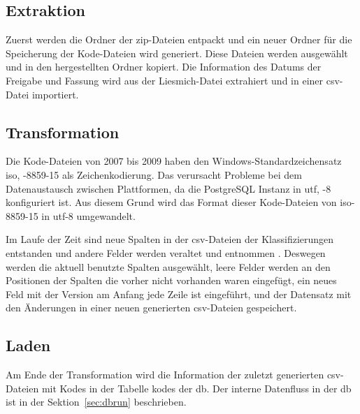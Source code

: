 \subsection{Extraktion} \label{subsec:extraction}

Zuerst werden die Ordner der \ac{zip}-Dateien entpackt und ein neuer Ordner für die Speicherung der Kode-Dateien wird generiert. Diese Dateien werden ausgewählt und in den hergestellten Ordner kopiert. Die Information des Datums der Freigabe und Fassung wird aus der Liesmich-Datei extrahiert und in einer \ac{csv}-Datei importiert.


\subsection{Transformation} \label{subsec:transf}

Die Kode-Dateien von 2007 bis 2009 haben den Windows-Standardzeichensatz \acl{iso}, -8859-15 als Zeichenkodierung. Das verursacht Probleme bei dem Datenaustausch zwischen Plattformen, da die PostgreSQL Instanz in \acl{utf}, -8 konfiguriert ist. Aus diesem Grund wird das Format dieser Kode-Dateien von \ac{iso}-8859-15 in \ac{utf}-8 umgewandelt.

Im Laufe der Zeit sind neue Spalten in der \ac{csv}-Dateien der Klassifizierungen entstanden und andere Felder werden veraltet und entnommen \cite{readme13, readme17}. Deswegen werden die aktuell benutzte Spalten ausgewählt, leere Felder werden an den Positionen der Spalten die vorher nicht vorhanden waren eingefügt, ein neues Feld mit der Version am Anfang jede Zeile ist eingeführt, und der Datensatz mit den Änderungen in einer neuen generierten \ac{csv}-Dateien gespeichert.


\subsection{Laden} \label{subsec:load}

Am Ende der Transformation wird die Information der zuletzt generierten \ac{csv}-Dateien mit Kodes in der Tabelle \textsf{kodes} der \ac{db}. Der interne Datenfluss in der \ac{db} ist in der Sektion~\ref{sec:dbrun} beschrieben.